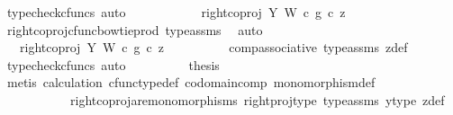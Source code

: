 \begin{isabellebody}
\ {\isacharparenleft}{\kern0pt}typecheck{\isacharunderscore}{\kern0pt}cfuncs{\isacharcomma}{\kern0pt}\ auto{\isacharparenright}{\kern0pt}\isanewline
\ \ \ \ \ \ \isamarkupfalse%
\ \isamarkupfalse%
\ {\isachardoublequoteopen}{\isachardot}{\kern0pt}{\isachardot}{\kern0pt}{\isachardot}{\kern0pt}\ {\isacharequal}{\kern0pt}\ {\isacharparenleft}{\kern0pt}right{\isacharunderscore}{\kern0pt}coproj\ Y\ W\ {\isasymcirc}\isactrlsub c\ g{\isacharparenright}{\kern0pt}\ {\isasymcirc}\isactrlsub c\ z{\isachardoublequoteclose}\isanewline
\ \ \ \ \ \ \ \ \isamarkupfalse%
\ right{\isacharunderscore}{\kern0pt}coproj{\isacharunderscore}{\kern0pt}cfunc{\isacharunderscore}{\kern0pt}bowtie{\isacharunderscore}{\kern0pt}prod\ type{\isacharunderscore}{\kern0pt}assms\ \isamarkupfalse%
\ auto\isanewline
\ \ \ \ \ \ \isamarkupfalse%
\ \isamarkupfalse%
\ {\isachardoublequoteopen}{\isachardot}{\kern0pt}{\isachardot}{\kern0pt}{\isachardot}{\kern0pt}\ {\isacharequal}{\kern0pt}\ right{\isacharunderscore}{\kern0pt}coproj\ Y\ W\ {\isasymcirc}\isactrlsub c\ g\ {\isasymcirc}\isactrlsub c\ z{\isachardoublequoteclose}\isanewline
\ \ \ \ \ \ \ \ \isamarkupfalse%
\ comp{\isacharunderscore}{\kern0pt}associative{}\ type{\isacharunderscore}{\kern0pt}assms{\isacharparenleft}{\kern0pt}{}{\isacharparenright}{\kern0pt}\ z{\isacharunderscore}{\kern0pt}def\ \isamarkupfalse%
\ {\isacharparenleft}{\kern0pt}typecheck{\isacharunderscore}{\kern0pt}cfuncs{\isacharcomma}{\kern0pt}\ auto{\isacharparenright}{\kern0pt}\isanewline
\ \ \ \ \ \ \isamarkupfalse%
\ \isamarkupfalse%
\ {\isacharquery}{\kern0pt}thesis\isanewline
\ \ \ \ \ \ \ \ \isamarkupfalse%
\ {\isacharparenleft}{\kern0pt}metis\ calculation\ cfunc{\isacharunderscore}{\kern0pt}type{\isacharunderscore}{\kern0pt}def\ codomain{\isacharunderscore}{\kern0pt}comp\ monomorphism{\isacharunderscore}{\kern0pt}def\ \isanewline
\ \ \ \ \ \ \ \ \ \ \ right{\isacharunderscore}{\kern0pt}coproj{\isacharunderscore}{\kern0pt}are{\isacharunderscore}{\kern0pt}monomorphisms\ right{\isacharunderscore}{\kern0pt}proj{\isacharunderscore}{\kern0pt}type\ type{\isacharunderscore}{\kern0pt}assms{\isacharparenleft}{\kern0pt}{}{\isacharparenright}{\kern0pt}\ y{\isacharunderscore}{\kern0pt}type{}\ z{\isacharunderscore}{\kern0pt}def{\isacharparenright}{\kern0pt}\isanewline
\ \ \ \ \isamarkupfalse%
\isanewline
\ \ \ \ \isamarkupfalse%

\end{isabellebody}
